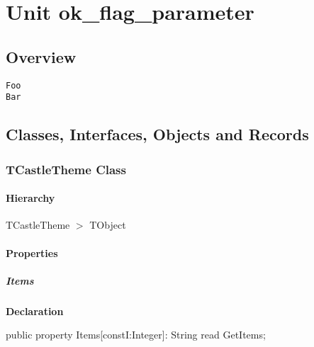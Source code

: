 \documentclass{report}
\begin{document}
\newlength{\tmplength}
\chapter{Unit ok{\_}flag{\_}parameter}
\section{Overview}
\begin{description}
\item[\texttt{\begin{ttfamily}TCastleTheme\end{ttfamily} Class}]
\end{description}
\begin{description}
\item[\texttt{Foo}]
\item[\texttt{Bar}]
\end{description}
\section{Classes, Interfaces, Objects and Records}
\subsection*{TCastleTheme Class}
\subsubsection*{\large{\textbf{Hierarchy}}\normalsize\hspace{1ex}\hfill}
TCastleTheme {$>$} TObject
\subsubsection*{\large{\textbf{Properties}}\normalsize\hspace{1ex}\hfill}
\paragraph*{Items}\hspace*{\fill}

\begin{list}{}{
\setlength{\itemindent}{0cm}
\setlength{\listparindent}{0cm}
\setlength{\leftmargin}{\evensidemargin}
\addtolength{\leftmargin}{\tmplength}
\settowidth{\labelsep}{X}
\addtolength{\leftmargin}{\labelsep}
\setlength{\labelwidth}{\tmplength}
}
\begin{flushleft}
\item[\textbf{Declaration}\hfill]
\begin{ttfamily}
public property Items[constI:Integer]: String read GetItems;\end{ttfamily}


\end{flushleft}
\end{list}
\end{document}
